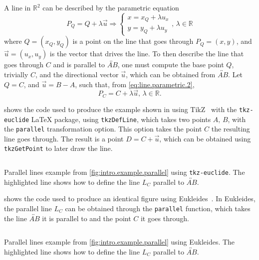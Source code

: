 A line in $\mathbb{R}^2$ can be described by the parametric equation
\begin{equation}\label{eq:line.parametric.2}
  P_Q = Q + \lambda\vec{u} \Rightarrow
  \begin{cases}
    x = x_Q + \lambda u_x \\
    y = y_Q + \lambda u_y
  \end{cases}
  ,\,\lambda \in \mathbb{R}
\end{equation}
where $Q = (x_Q, y_Q)$ is a point on the line that goes through $P_Q = (x, y)$,
and $\vec{u} = (u_x, u_y)$ is the vector that drives the line.  To then describe
the line that goes through $C$ and is parallel to $\overleftrightarrow{AB}$, one
must compute the base point $Q$, trivially $C$, and the directional vector
$\vec{u}$, which can be obtained from $\overleftrightarrow{AB}$.  Let $Q = C$,
and $\vec{u} = B - A$, such that, from \cref{eq:line.parametric.2},
\[
  P_C = C + \lambda \vec{u},\,\lambda \in \mathbb{R}.
\]

 shows the code used to produce the
example shown in  using
TikZ~\cite{Tantau:2015:tikz-manual} with the \texttt{tkz-euclide} \LaTeX{}
package, using \texttt{tkzDefLine}, which takes two points $A,\,B$, with the
\texttt{parallel} transformation option.  This option takes the point $C$ the
resulting line goes through.  The result is a point $D = C + \vec{u}$, which can
be obtained using \texttt{tkzGetPoint} to later draw the line. 

\begin{listing}[htb]
  \inputminted[highlightlines=3]{latex}{tikz/ex-parallel.tex}
  \caption[Parallel lines example using \texttt{tkz-euclide}]{
    Parallel lines example from \cref{fig:intro.example.parallel} using
    \texttt{tkz-euclide}.  The highlighted line shows how to define the line
    $L_C$ parallel to $\overleftrightarrow{AB}$.}%
  \label{lst:intro.example.parallel.tikz}
\end{listing}

 shows the code used to produce an
identical figure using Eukleides~\cite{Obrecht:2010:EM}.  In Eukleides, the
parallel line $L_C$ can be obtained through the \texttt{parallel} function,
which takes the line $\overleftrightarrow{AB}$ it is parallel to and the point
$C$ it goes through.

\begin{listing}[htb]
  \inputminted[highlightlines=3]{text}{euk/ex-parallel.euk}
  \caption[Parallel lines example using Eukleides]{
    Parallel lines example from \cref{fig:intro.example.parallel} using
    Eukleides.  The highlighted line shows how to define the line $L_C$
    parallel to $\overleftrightarrow{AB}$.}%
  \label{lst:intro.example.parallel.euk}
\end{listing}


